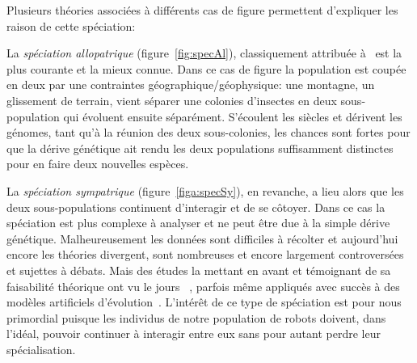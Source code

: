 \documentclass[a4paper,10pt]{report}
\begin{document}
Plusieurs théories associées à différents cas de figure permettent d'expliquer les raison de cette spéciation:

La \emph{spéciation allopatrique} (figure~\ref{fig:specAl}),  classiquement attribuée à~\cite{mayr1942systematics} est la plus courante et la mieux connue. Dans ce cas de figure la population est coupée en deux par une contraintes géographique/géophysique: une montagne, un glissement de terrain, vient séparer une colonies d'insectes en deux sous-population qui évoluent ensuite séparément. S'écoulent les siècles et dérivent les génomes, tant qu'à la réunion des deux sous-colonies, les chances sont fortes pour que la dérive génétique ait rendu les deux populations suffisamment distinctes pour en faire deux nouvelles espèces.

La \emph{spéciation sympatrique} (figure~\ref{figa:specSy}),  en revanche, a lieu alors que les deux sous-populations continuent d'interagir et de se côtoyer. Dans ce cas la spéciation est plus complexe à analyser et ne peut être due à la simple dérive génétique. Malheureusement les données sont difficiles à récolter et aujourd'hui encore les théories divergent, sont nombreuses et encore largement controversées et sujettes à débats. Mais des études la mettant en avant et témoignant de sa faisabilité théorique ont vu le jours~\citep{geritz97evolutionarilysingularstrategiesadaptivegrowthbranchingevolutionarytree,dieckmann99originspeciesbysympatricspeciation}
, parfois même appliqués avec succès à des modèles artificiels d'évolution~\citep{holmgren07artificialneuralnetworksmodelsspecializationguildevolutionsympatricspeciation}. L'intérêt de ce type de spéciation est pour nous primordial puisque les individus de notre population de robots doivent, dans l'idéal, pouvoir continuer à interagir entre eux sans pour autant perdre leur spécialisation.



\end{document}
